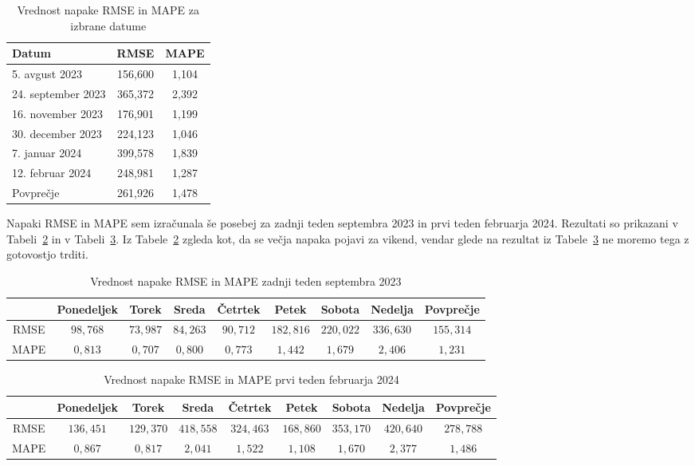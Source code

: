 \documentclass[a4paper, 11pt]{article}
\begin{document}
\begin{table}[!ht]
    \centering
    \caption{Vrednost napake RMSE in MAPE za izbrane datume}\par\medskip
    \label{Tab:RMSE_MAPE}
    \begin{tabular}{l|c|c}
        Datum & RMSE & MAPE \\ \hline
        5. avgust 2023 & 156,600 & 1,104 \\ 
        24. september 2023 & 365,372 & 2,392 \\ 
        16. november 2023 & 176,901 & 1,199 \\ 
        30. december 2023 & 224,123 & 1,046 \\ 
        7. januar 2024 & 399,578 & 1,839 \\ 
        12. februar 2024 & 248,981 & 1,287 \\ \hline
        Povprečje & 261,926 & 1,478 \\ 
    \end{tabular}
\end{table}


\noindent Napaki RMSE in MAPE sem izračunala še posebej za zadnji teden septembra 2023 in 
prvi teden februarja 2024. Rezultati so prikazani v Tabeli~\ref{Tab:RMSE_MAPE_sept}  in v Tabeli~\ref{Tab:RMSE_MAPE_feb}. 
Iz Tabele~\ref{Tab:RMSE_MAPE_sept} zgleda kot, da se večja napaka pojavi za vikend, vendar glede na rezultat iz
Tabele~\ref{Tab:RMSE_MAPE_feb} ne moremo tega z gotovostjo trditi. 


\begin{table}[!ht]
    \centering
    \caption{Vrednost napake RMSE in MAPE zadnji teden septembra 2023}\par\medskip
    \label{Tab:RMSE_MAPE_sept}
    \begin{tabular}{c||c|c|c|c|c|c|c||c}
        ~ & Ponedeljek & Torek & Sreda & Četrtek & Petek & Sobota & Nedelja & Povprečje\\ \hline
        RMSE & $98{,}768$ & $73{,}987$ & $84{,}263$ & $90{,}712$ & $182{,}816$ & $220{,}022$ & $336{,}630$ & $155{,}314$ \\ 
        MAPE & $0{,}813$ & $0{,}707$ & $0{,}800$ & $0{,}773$ & $1{,}442$ & $1{,}679$ & $2{,}406$ & $1{,}231$\\ 
    \end{tabular}
\end{table}


\begin{table}[!ht]
    \centering
    \caption{Vrednost napake RMSE in MAPE prvi teden februarja 2024}\par\medskip
    \label{Tab:RMSE_MAPE_feb}
    \begin{tabular}{c||c|c|c|c|c|c|c||c}
        ~ & Ponedeljek & Torek & Sreda & Četrtek & Petek & Sobota & Nedelja & Povprečje\\ \hline
        RMSE & $136{,}451$ & $129{,}370$ & $418{,}558$ & $324{,}463$ & $168{,}860$ & $353{,}170$ & $420{,}640$ & $278{,}788$\\ 
        MAPE & $0{,}867$ & $0{,}817$ & $2{,}041$ & $1{,}522$ & $1{,}108$ & $1{,}670$ & $2{,}377$ & $1{,}486$\\ 
    \end{tabular}
\end{table} 
\end{document}
